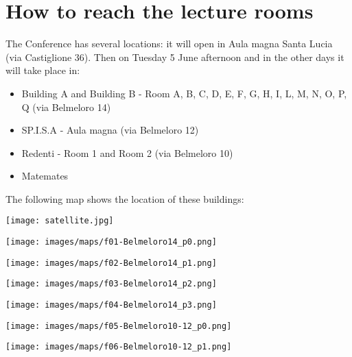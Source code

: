 \section*{How to reach the lecture rooms}
The Conference has several locations: it will open in Aula magna Santa Lucia (via Castiglione 36).
Then on Tuesday 5 June afternoon and in the other days it will take place in:

\bigskip

\begin{itemize}
\item Building A and Building B - Room A, B, C, D, E, F, G, H, I, L, M, N, O, P, Q (via Belmeloro 14)
\item SP.I.S.A - Aula magna (via Belmeloro 12)
\item Redenti - Room 1 and Room 2 (via Belmeloro 10)
\item Matemates
\end{itemize}

\bigskip

\noindent The following map shows the location of these buildings:

\bigskip

\texttt{[image: satellite.jpg]}

\newpage

\texttt{[image: images/maps/f01-Belmeloro14\_p0.png]}

\vspace{2cm}

\texttt{[image: images/maps/f02-Belmeloro14\_p1.png]}

\newpage

\texttt{[image: images/maps/f03-Belmeloro14\_p2.png]}

\vspace{2cm}

\texttt{[image: images/maps/f04-Belmeloro14\_p3.png]}

\newpage

\texttt{[image: images/maps/f05-Belmeloro10-12\_p0.png]}

\vspace{2cm}

\texttt{[image: images/maps/f06-Belmeloro10-12\_p1.png]}

\newpage

